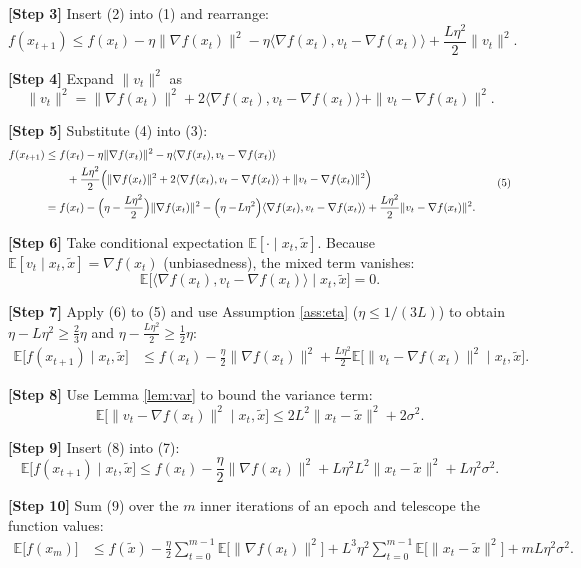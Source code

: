 \documentclass{article}
\newcommand{\E}{\mathbb{E}}
\begin{document}
\noindent\textbf{[Step 3]} Insert (2) into (1) and rearrange:
\[
f(x_{t+1})\le f(x_t)-\eta\|\nabla f(x_t)\|^{2}
-\eta\langle\nabla f(x_t),v_t-\nabla f(x_t)\rangle
+\frac{L\eta^{2}}{2}\|v_t\|^{2}.
\tag{3}
\]

\noindent\textbf{[Step 4]} Expand $\|v_t\|^{2}$ as
\[
\|v_t\|^{2}
=\|\nabla f(x_t)\|^{2}
+2\langle\nabla f(x_t),v_t-\nabla f(x_t)\rangle
+\|v_t-\nabla f(x_t)\|^{2}.
\tag{4}
\]

\noindent\textbf{[Step 5]} Substitute (4) into (3):
\[
\begin{aligned}
f(x_{t+1})
&\le f(x_t)-\eta\|\nabla f(x_t)\|^{2}
-\eta\langle\nabla f(x_t),v_t-\nabla f(x_t)\rangle\\
&\qquad+\frac{L\eta^{2}}{2}\Bigl(\|\nabla f(x_t)\|^{2}
+2\langle\nabla f(x_t),v_t-\nabla f(x_t)\rangle
+\|v_t-\nabla f(x_t)\|^{2}\Bigr)\\
&= f(x_t)-\Bigl(\eta-\frac{L\eta^{2}}{2}\Bigr)\|\nabla f(x_t)\|^{2}
-\Bigl(\eta-\!L\eta^{2}\Bigr)\langle\nabla f(x_t),v_t-\nabla f(x_t)\rangle
+\frac{L\eta^{2}}{2}\|v_t-\nabla f(x_t)\|^{2}.
\end{aligned}
\tag{5}
\]

\noindent\textbf{[Step 6]} Take conditional expectation $\E[\cdot\mid x_t,\tilde{x}]$.
Because $\E[v_t\mid x_t,\tilde{x}]=\nabla f(x_t)$ (unbiasedness), the mixed term vanishes:
\[
\E\!\bigl[\langle\nabla f(x_t),v_t-\nabla f(x_t)\rangle\mid x_t,\tilde{x}\bigr]=0.
\tag{6}
\]

\noindent\textbf{[Step 7]} Apply (6) to (5) and use Assumption \ref{ass:eta} ($\eta\le 1/(3L)$) to obtain $\eta-L\eta^{2}\ge \frac{2}{3}\eta$ and $\eta-\frac{L\eta^{2}}{2}\ge \frac{1}{2}\eta$:
\[
\begin{aligned}
\E\!\bigl[f(x_{t+1})\mid x_t,\tilde{x}\bigr]
&\le f(x_t)-\frac{\eta}{2}\|\nabla f(x_t)\|^{2}
+\frac{L\eta^{2}}{2}\E\!\bigl[\|v_t-\nabla f(x_t)\|^{2}\mid x_t,\tilde{x}\bigr].
\end{aligned}
\tag{7}
\]

\noindent\textbf{[Step 8]} Use Lemma \ref{lem:var} to bound the variance term:
\[
\E\!\bigl[\|v_t-\nabla f(x_t)\|^{2}\mid x_t,\tilde{x}\bigr]
\le 2L^{2}\|x_t-\tilde{x}\|^{2}+2\sigma^{2}.
\tag{8}
\]

\noindent\textbf{[Step 9]} Insert (8) into (7):
\[
\E\!\bigl[f(x_{t+1})\mid x_t,\tilde{x}\bigr]
\le f(x_t)-\frac{\eta}{2}\|\nabla f(x_t)\|^{2}
+L\eta^{2}L^{2}\|x_t-\tilde{x}\|^{2}
+L\eta^{2}\sigma^{2}.
\tag{9}
\]

\noindent\textbf{[Step 10]} Sum (9) over the $m$ inner iterations of an epoch and telescope the function values:
\[
\begin{aligned}
\E\!\bigl[f(x_{m})\bigr] 
&\le f(\tilde{x})-\frac{\eta}{2}\sum_{t=0}^{m-1}\E\!\bigl[\|\nabla f(x_t)\|^{2}\bigr]
+L^{3}\eta^{2}\sum_{t=0}^{m-1}\E\!\bigl[\|x_t-\tilde{x}\|^{2}\bigr]
+mL\eta^{2}\sigma^{2}.
\end{aligned}
\tag{10}
\]
\end{document}
